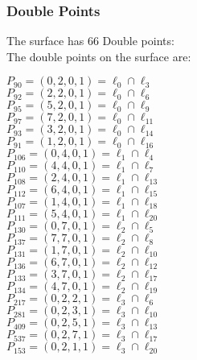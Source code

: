 \documentclass{article}
\begin{document}
{\subsubsection*{Double Points}
The surface has 66 Double points:\\
The double points on the surface are:\\
\begin{multicols}{2}
\noindent
$P_{90} = ( 0, 2, 0, 1 ) = \ell_{0} \cap \ell_{3} $\\
$P_{92} = ( 2, 2, 0, 1 ) = \ell_{0} \cap \ell_{6} $\\
$P_{95} = ( 5, 2, 0, 1 ) = \ell_{0} \cap \ell_{9} $\\
$P_{97} = ( 7, 2, 0, 1 ) = \ell_{0} \cap \ell_{11} $\\
$P_{93} = ( 3, 2, 0, 1 ) = \ell_{0} \cap \ell_{14} $\\
$P_{91} = ( 1, 2, 0, 1 ) = \ell_{0} \cap \ell_{16} $\\
$P_{106} = ( 0, 4, 0, 1 ) = \ell_{1} \cap \ell_{4} $\\
$P_{110} = ( 4, 4, 0, 1 ) = \ell_{1} \cap \ell_{7} $\\
$P_{108} = ( 2, 4, 0, 1 ) = \ell_{1} \cap \ell_{13} $\\
$P_{112} = ( 6, 4, 0, 1 ) = \ell_{1} \cap \ell_{15} $\\
$P_{107} = ( 1, 4, 0, 1 ) = \ell_{1} \cap \ell_{18} $\\
$P_{111} = ( 5, 4, 0, 1 ) = \ell_{1} \cap \ell_{20} $\\
$P_{130} = ( 0, 7, 0, 1 ) = \ell_{2} \cap \ell_{5} $\\
$P_{137} = ( 7, 7, 0, 1 ) = \ell_{2} \cap \ell_{8} $\\
$P_{131} = ( 1, 7, 0, 1 ) = \ell_{2} \cap \ell_{10} $\\
$P_{136} = ( 6, 7, 0, 1 ) = \ell_{2} \cap \ell_{12} $\\
$P_{133} = ( 3, 7, 0, 1 ) = \ell_{2} \cap \ell_{17} $\\
$P_{134} = ( 4, 7, 0, 1 ) = \ell_{2} \cap \ell_{19} $\\
$P_{217} = ( 0, 2, 2, 1 ) = \ell_{3} \cap \ell_{6} $\\
$P_{281} = ( 0, 2, 3, 1 ) = \ell_{3} \cap \ell_{10} $\\
$P_{409} = ( 0, 2, 5, 1 ) = \ell_{3} \cap \ell_{13} $\\
$P_{537} = ( 0, 2, 7, 1 ) = \ell_{3} \cap \ell_{17} $\\
$P_{153} = ( 0, 2, 1, 1 ) = \ell_{3} \cap \ell_{20} $\\

\end{multicols}}
\end{document}
